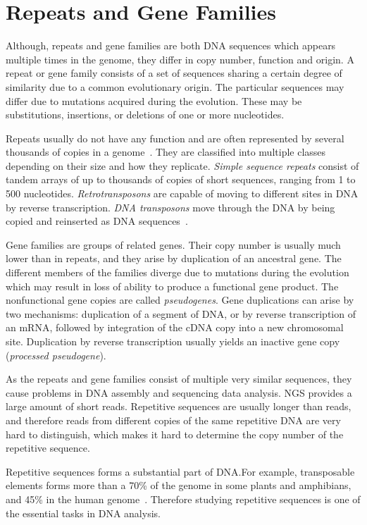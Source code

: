 \chapter[Rep.\ and Gene Fam.]{Repeats and Gene Families}\label{chap:repeatsfamilies}

Although, repeats and gene families are both DNA sequences which appears multiple times in the genome, they differ in copy number, function and origin.
A repeat or gene family consists of a set of sequences sharing a certain degree of similarity due to a common evolutionary origin. The particular sequences may differ due to mutations acquired during the evolution. These may be substitutions, insertions, or deletions of one or more nucleotides.

Repeats usually do not have any function and are often represented by several thousands of copies in a genome~\cite{cell}. They are classified into multiple classes depending on their size and how they replicate.
\emph{Simple sequence repeats} consist of tandem arrays of up to thousands of copies of short sequences, ranging from 1 to 500 nucleotides.
\emph{Retrotransposons} are capable of moving to different sites in DNA by reverse transcription.
\emph{DNA transposons} move through the DNA by being copied and reinserted as DNA sequences~\cite{cell}.

Gene families are groups of related genes.
Their copy number is usually much lower than in repeats, and they arise by duplication of an ancestral gene. The different members of the families diverge due to mutations during the evolution which may result in loss of ability to produce a functional gene product. The nonfunctional gene copies are called \emph{pseudogenes}.
Gene duplications can arise by two mechanisms: duplication of a segment of DNA, or by reverse transcription of an mRNA, followed by integration of the cDNA copy into a new chromosomal site.
Duplication by reverse transcription usually yields an inactive gene copy (\emph{processed pseudogene}).

As the repeats and gene families consist of multiple very similar sequences, they cause problems in DNA assembly and sequencing data analysis. NGS provides a large amount of short reads. Repetitive sequences are usually longer than reads, and therefore reads from different copies of the same repetitive DNA are very hard to distinguish, which makes it hard to determine the copy number of the repetitive sequence.

Repetitive sequences forms a substantial part of DNA.\@ For example,
transposable elements forms more than a 70\% of the genome in some plants and amphibians, and 45\% in the human genome~\cite{biemont2006genetics}.
Therefore studying repetitive sequences is one of the essential tasks in DNA analysis.

